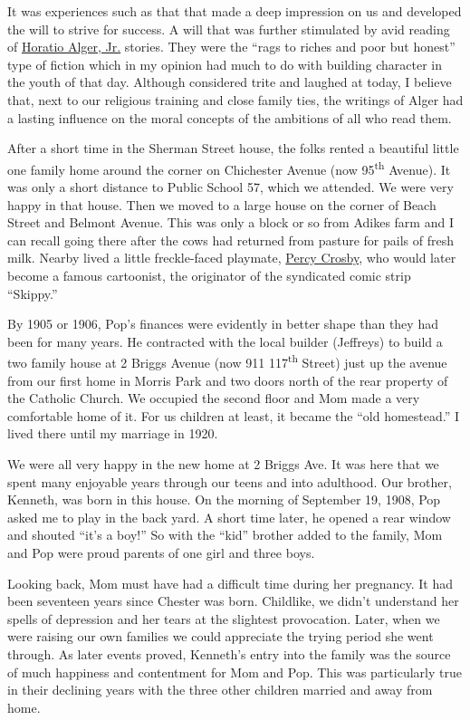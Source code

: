 \documentclass[12pt]{book}              %
\begin{document}
It was experiences such as that that made a deep impression on us and developed the will to strive for success. A will that was further stimulated by avid reading of \href{http://en.wikipedia.org/wiki/Horatio_Alger,_Jr.}{Horatio Alger, Jr.} stories. They were the ``rags to riches and poor but honest'' type of fiction which in my opinion had much to do with building character in the youth of that day. Although considered trite and laughed at today, I believe that, next to our religious training and close family ties, the writings of Alger had a lasting influence on the moral concepts of the ambitions of all who read them.

After a short time in the Sherman Street house, the folks rented a beautiful little one family home around the corner on Chichester Avenue (now 95\textsuperscript{th} Avenue).  It was only a short distance to Public School 57, which we attended. We were very happy in that house. Then we moved to a large house on the corner of Beach Street and Belmont Avenue. This was only a block or so from Adikes farm and I can recall going there after the cows had returned from pasture for pails of fresh milk. Nearby lived a little freckle-faced playmate, \href{http://en.wikipedia.org/wiki/Percy_Crosby}{Percy Crosby}, who would later become a famous cartoonist, the originator of the syndicated comic strip ``Skippy.'' 


By 1905 or 1906, Pop's finances were evidently in better shape than they had been for many years. He contracted with the local builder (Jeffreys) to build a two family house at 2 Briggs Avenue (now 911 117\textsuperscript{th} Street) just up the avenue from our first home in Morris Park and two doors north of the rear property of the Catholic Church. We occupied the second floor and Mom made a very comfortable home of it. For us children at least, it became the ``old homestead.'' I lived there until my marriage in 1920.

We were all very happy in the new home at 2 Briggs Ave. It was here that we spent many enjoyable years through our teens and into adulthood. Our brother, Kenneth, was born in this house. On the morning of September 19, 1908, Pop asked me to play in the back yard. A short time later, he opened a rear window and shouted ``it's a boy!'' So with the ``kid'' brother added to the family, Mom and Pop were proud parents of one girl and three boys. 

Looking back, Mom must have had a difficult time during her pregnancy. It had been seventeen years since Chester was born. Childlike, we didn't understand her spells of depression and her tears at the slightest provocation. Later, when we were raising our own families we could appreciate the trying period she went through. As later events proved, Kenneth's entry into the family was the source of much happiness and contentment for Mom and Pop. This was particularly true in their declining years with the three other children married and away from home.
\end{document}
